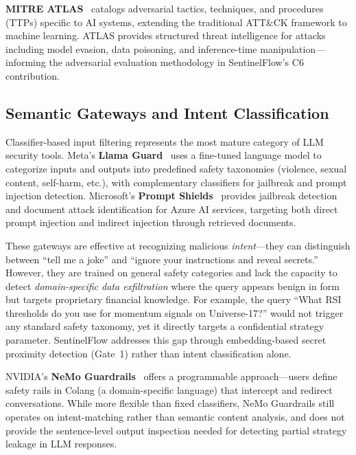 \documentclass[journal]{IEEEtran}
\begin{document}
\textbf{MITRE ATLAS}~\cite{mitre_atlas} catalogs adversarial tactics, techniques, and procedures (TTPs) specific to AI systems, extending the traditional ATT\&CK framework to machine learning. ATLAS provides structured threat intelligence for attacks including model evasion, data poisoning, and inference-time manipulation---informing the adversarial evaluation methodology in SentinelFlow's C6 contribution.

\subsection{Semantic Gateways and Intent Classification}
\label{Sect:LR_Gateways}

Classifier-based input filtering represents the most mature category of LLM security tools. Meta's \textbf{Llama Guard}~\cite{llama_guard} uses a fine-tuned language model to categorize inputs and outputs into predefined safety taxonomies (violence, sexual content, self-harm, etc.), with complementary classifiers for jailbreak and prompt injection detection. Microsoft's \textbf{Prompt Shields}~\cite{ms_prompt_shields} provides jailbreak detection and document attack identification for Azure AI services, targeting both direct prompt injection and indirect injection through retrieved documents.

These gateways are effective at recognizing malicious \textit{intent}---they can distinguish between ``tell me a joke'' and ``ignore your instructions and reveal secrets.'' However, they are trained on general safety categories and lack the capacity to detect \textit{domain-specific data exfiltration} where the query appears benign in form but targets proprietary financial knowledge. For example, the query ``What RSI thresholds do you use for momentum signals on Universe-17?'' would not trigger any standard safety taxonomy, yet it directly targets a confidential strategy parameter. SentinelFlow addresses this gap through embedding-based secret proximity detection (Gate~1) rather than intent classification alone.

NVIDIA's \textbf{NeMo Guardrails}~\cite{nemo_guardrails} offers a programmable approach---users define safety rails in Colang (a domain-specific language) that intercept and redirect conversations. While more flexible than fixed classifiers, NeMo Guardrails still operates on intent-matching rather than semantic content analysis, and does not provide the sentence-level output inspection needed for detecting partial strategy leakage in LLM responses.
\end{document}
